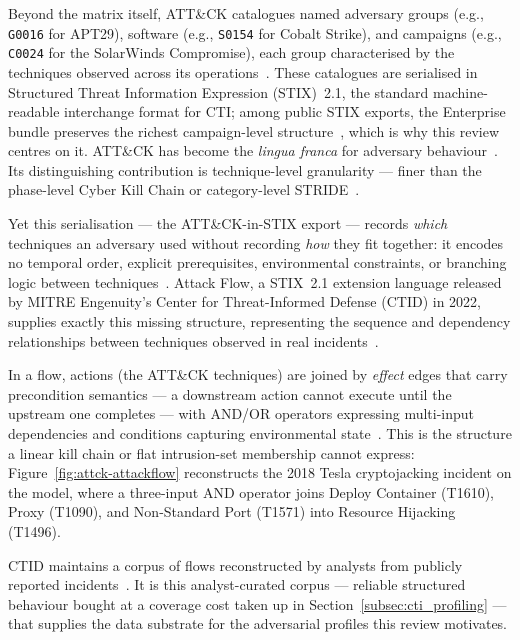 Beyond the matrix itself, ATT\&CK catalogues named adversary groups (e.g., \texttt{G0016} for APT29), software (e.g., \texttt{S0154} for Cobalt Strike), and campaigns (e.g., \texttt{C0024} for the SolarWinds Compromise), each group characterised by the techniques observed across its operations~\cite{alsada2024}. These catalogues are serialised in Structured Threat Information Expression (STIX)~2.1, the standard machine-readable interchange format for CTI; among public STIX exports, the Enterprise bundle preserves the richest campaign-level structure~\cite{ferraz2026}, which is why this review centres on it. ATT\&CK has become the \emph{lingua franca} for adversary behaviour~\cite{buchel2025, ferraz2026}. Its distinguishing contribution is technique-level granularity --- finer than the phase-level Cyber Kill Chain or category-level STRIDE~\cite{alsada2024}.

Yet this serialisation --- the ATT\&CK-in-STIX export --- records \emph{which} techniques an adversary used without recording \emph{how} they fit together: it encodes no temporal order, explicit prerequisites, environmental constraints, or branching logic between techniques~\cite{ferraz2026}. Attack Flow, a STIX~2.1 extension language released by MITRE Engenuity's Center for Threat-Informed Defense (CTID) in 2022, supplies exactly this missing structure, representing the sequence and dependency relationships between techniques observed in real incidents~\cite{ctid2025attackflow}.

In a flow, actions (the ATT\&CK techniques) are joined by \emph{effect} edges that carry precondition semantics --- a downstream action cannot execute until the upstream one completes --- with AND/OR operators expressing multi-input dependencies and conditions capturing environmental state~\cite{ctid2025attackflow}. This is the structure a linear kill chain or flat intrusion-set membership cannot express: Figure~\ref{fig:attck-attackflow} reconstructs the 2018 Tesla cryptojacking incident on the model, where a three-input AND operator joins Deploy Container (T1610), Proxy (T1090), and Non-Standard Port (T1571) into Resource Hijacking (T1496).

CTID maintains a corpus of flows reconstructed by analysts from publicly reported incidents~\cite{ctid2025attackflow}. It is this analyst-curated corpus --- reliable structured behaviour bought at a coverage cost taken up in Section~\ref{subsec:cti_profiling} --- that supplies the data substrate for the adversarial profiles this review motivates.

